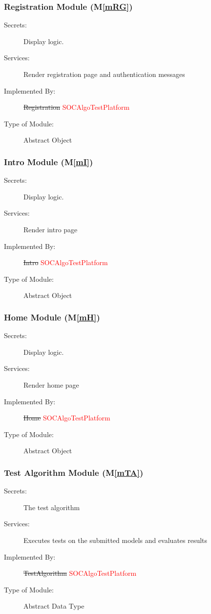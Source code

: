 \documentclass[12pt, titlepage]{article}
\newcommand{\mref}[1]{M\ref{#1}}
\begin{document}
\subsubsection{Registration Module (\mref{mRG})}

\begin{description}
\item[Secrets:] Display logic.
\item[Services:] Render registration page and authentication messages
\item[Implemented By:] \sout{Registration}  \textcolor{red}{SOCAlgoTestPlatform}
\item[Type of Module:] Abstract Object
\end{description}

\subsubsection{Intro Module (\mref{mI})}

\begin{description}
\item[Secrets:] Display logic.
\item[Services:] Render intro page
\item[Implemented By:] \sout{Intro}  \textcolor{red}{SOCAlgoTestPlatform}
\item[Type of Module:] Abstract Object
\end{description}

\subsubsection{Home Module (\mref{mH})}

\begin{description}
\item[Secrets:] Display logic.
\item[Services:] Render home page
\item[Implemented By:] \sout{Home}  \textcolor{red}{SOCAlgoTestPlatform}
\item[Type of Module:] Abstract Object
\end{description}

\subsubsection{Test Algorithm Module (\mref{mTA})}

\begin{description}
\item[Secrets:] The test algorithm
\item[Services:] Executes tests on the submitted models and evaluates results
\item[Implemented By:] \sout{TestAlgorithm}  \textcolor{red}{SOCAlgoTestPlatform}
\item[Type of Module:] Abstract Data Type
\end{description}
\end{document}
